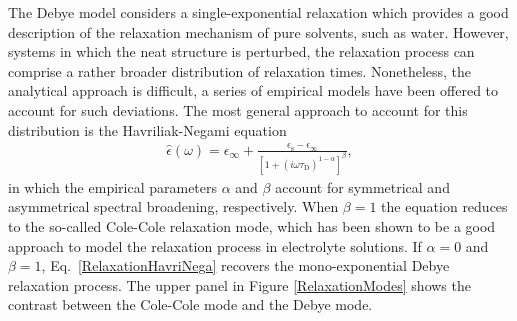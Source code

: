 The Debye model considers a single-exponential relaxation which provides a good description of the relaxation mechanism of pure solvents, such as water.\!\cite{Buchner1999b,Buchner2008} However, systems in which the neat structure is perturbed, the relaxation process can comprise a rather broader distribution of relaxation times. Nonetheless, the analytical approach is difficult, a series of empirical models have been offered to account for such deviations. The most general approach to account for this distribution is the Havriliak-Negami equation\!\cite{Havriliak1966}
\begin{eqnarray}
\hat{\epsilon} (\omega) =  \epsilon_\infty + \frac{ \epsilon_\text{s} - \epsilon_\infty }{[1 + (i \omega \tau_\text{D})^{1-\alpha} ]^\beta},
\label{RelaxationHavriNega}
\end{eqnarray}
\noindent in which the empirical parameters $\alpha$ and $\beta$ account for symmetrical and asymmetrical spectral broadening, respectively. When $\beta = 1$ the equation reduces to the so-called Cole-Cole relaxation mode,\!\cite{Cole1941a,Cole1955} which has been shown to be a good approach to model the relaxation process in electrolyte solutions.\!\cite{Kaatze1993,Nortemann1997,Buchner1999,Ottosson2014c,Cota2018} If $\alpha = 0$ and $\beta = 1$, Eq.\ \ref{RelaxationHavriNega} recovers the mono-exponential Debye relaxation process. The upper panel in Figure \ref{RelaxationModes} shows the contrast between the Cole-Cole mode and the Debye mode. 


\newpage

